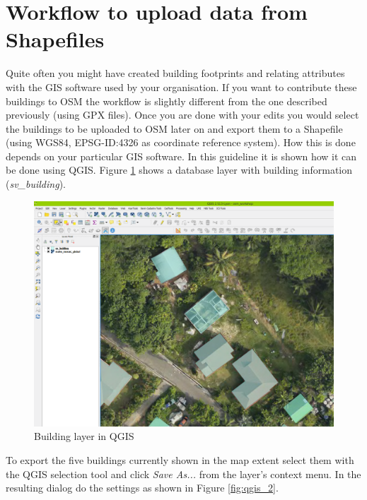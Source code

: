 \documentclass[a4paper,12pt,titlepage]{article}
\begin{document}
\section{Workflow to upload data from Shapefiles}

Quite often you might have created building footprints and relating attributes with the GIS software used by your organisation. If you want to contribute these buildings to OSM the workflow is slightly different from the one described previously (using GPX files). Once you are done with your edits you would select the buildings to be uploaded to OSM later on and export them to a Shapefile (using WGS84, EPSG-ID:4326 as coordinate reference system). How this is done depends on your particular GIS software. In this guideline it is shown how it can be done using QGIS. Figure \ref{fig:qgis_1} shows a database layer with building information (\textit{sv\_building}).

\begin{figure}[H]
	\centering
	\includegraphics[width=12cm]{Images/qgis_1.png}
	\caption{Building layer in QGIS}\label{fig:qgis_1}
\end{figure}

To export the five buildings currently shown in the map extent select them with the QGIS selection tool and click \textit{Save As...} from the layer's context menu. In the resulting dialog do the settings as shown in Figure \ref{fig:qgis_2}.
\end{document}
